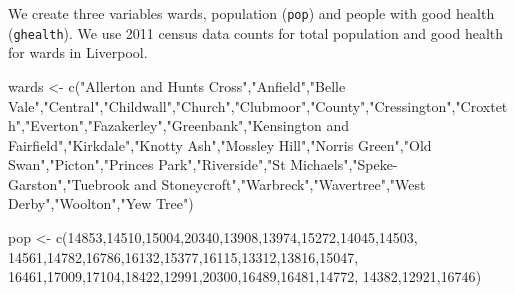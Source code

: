\documentclass[
]{book}
\newenvironment{Shaded}{\begin{snugshade}}{\end{snugshade}}
\newcommand{\DecValTok}[1]{\textcolor[rgb]{0.00,0.00,0.81}{#1}}
\newcommand{\FunctionTok}[1]{\textcolor[rgb]{0.00,0.00,0.00}{#1}}
\newcommand{\NormalTok}[1]{#1}
\newcommand{\OtherTok}[1]{\textcolor[rgb]{0.56,0.35,0.01}{#1}}
\newcommand{\StringTok}[1]{\textcolor[rgb]{0.31,0.60,0.02}{#1}}
\begin{document}
We create three variables wards, population (\texttt{pop}) and people with good health (\texttt{ghealth}). We use 2011 census data counts for total population and good health for wards in Liverpool.

\begin{Shaded}
\begin{Highlighting}[]
\NormalTok{wards }\OtherTok{\textless{}{-}} \FunctionTok{c}\NormalTok{(}\StringTok{"Allerton and Hunts Cross"}\NormalTok{,}\StringTok{"Anfield"}\NormalTok{,}\StringTok{"Belle Vale"}\NormalTok{,}\StringTok{"Central"}\NormalTok{,}\StringTok{"Childwall"}\NormalTok{,}\StringTok{"Church"}\NormalTok{,}\StringTok{"Clubmoor"}\NormalTok{,}\StringTok{"County"}\NormalTok{,}\StringTok{"Cressington"}\NormalTok{,}\StringTok{"Croxteth"}\NormalTok{,}\StringTok{"Everton"}\NormalTok{,}\StringTok{"Fazakerley"}\NormalTok{,}\StringTok{"Greenbank"}\NormalTok{,}\StringTok{"Kensington and Fairfield"}\NormalTok{,}\StringTok{"Kirkdale"}\NormalTok{,}\StringTok{"Knotty Ash"}\NormalTok{,}\StringTok{"Mossley Hill"}\NormalTok{,}\StringTok{"Norris Green"}\NormalTok{,}\StringTok{"Old Swan"}\NormalTok{,}\StringTok{"Picton"}\NormalTok{,}\StringTok{"Princes Park"}\NormalTok{,}\StringTok{"Riverside"}\NormalTok{,}\StringTok{"St Michael\textquotesingle{}s"}\NormalTok{,}\StringTok{"Speke{-}Garston"}\NormalTok{,}\StringTok{"Tuebrook and Stoneycroft"}\NormalTok{,}\StringTok{"Warbreck"}\NormalTok{,}\StringTok{"Wavertree"}\NormalTok{,}\StringTok{"West Derby"}\NormalTok{,}\StringTok{"Woolton"}\NormalTok{,}\StringTok{"Yew Tree"}\NormalTok{)}

\NormalTok{pop }\OtherTok{\textless{}{-}} \FunctionTok{c}\NormalTok{(}\DecValTok{14853}\NormalTok{,}\DecValTok{14510}\NormalTok{,}\DecValTok{15004}\NormalTok{,}\DecValTok{20340}\NormalTok{,}\DecValTok{13908}\NormalTok{,}\DecValTok{13974}\NormalTok{,}\DecValTok{15272}\NormalTok{,}\DecValTok{14045}\NormalTok{,}\DecValTok{14503}\NormalTok{,}
                \DecValTok{14561}\NormalTok{,}\DecValTok{14782}\NormalTok{,}\DecValTok{16786}\NormalTok{,}\DecValTok{16132}\NormalTok{,}\DecValTok{15377}\NormalTok{,}\DecValTok{16115}\NormalTok{,}\DecValTok{13312}\NormalTok{,}\DecValTok{13816}\NormalTok{,}\DecValTok{15047}\NormalTok{,}
                \DecValTok{16461}\NormalTok{,}\DecValTok{17009}\NormalTok{,}\DecValTok{17104}\NormalTok{,}\DecValTok{18422}\NormalTok{,}\DecValTok{12991}\NormalTok{,}\DecValTok{20300}\NormalTok{,}\DecValTok{16489}\NormalTok{,}\DecValTok{16481}\NormalTok{,}\DecValTok{14772}\NormalTok{,}
                \DecValTok{14382}\NormalTok{,}\DecValTok{12921}\NormalTok{,}\DecValTok{16746}\NormalTok{)}


\end{Highlighting}
\end{Shaded}
\end{document}
